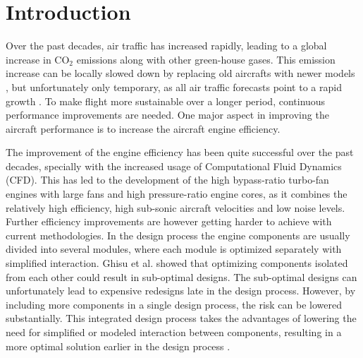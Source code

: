 ﻿%

\chapter{Introduction} \label{ch:Intro}
Over the past decades, air traffic has increased rapidly, leading to a global increase in CO$_2$ emissions along with other green-house gases. This emission increase can be locally slowed down by replacing old aircrafts with newer models \cite{emission}, but unfortunately only temporary, as all air traffic forecasts point to a rapid growth \cite{airbus,jadc}. To make flight more sustainable over a longer period, continuous performance improvements are needed. One major aspect in improving the aircraft performance is to increase the aircraft engine efficiency.

The improvement of the engine efficiency has been quite successful over the past decades, specially with the increased usage of Computational Fluid Dynamics (CFD). This has led to the development of the high bypass-ratio turbo-fan engines with large fans and high pressure-ratio engine cores, as it combines the relatively high efficiency, high sub-sonic aircraft velocities and low noise levels. Further efficiency improvements are however getting harder to achieve with current methodologies. In the design process the engine components are usually divided into several modules, where each module is optimized separately with simplified interaction. Ghisu et al. \cite{IntegrP2} showed that optimizing components isolated from each other could result in sub-optimal designs. The sub-optimal designs can unfortunately lead to expensive redesigns late in the design process. However, by including more components in a single design process, the risk can be lowered substantially. This integrated design process takes the advantages of lowering the need for simplified or modeled interaction between components, resulting in a more optimal solution earlier in the design process \cite{IntegrP1,IntegrP2}.

